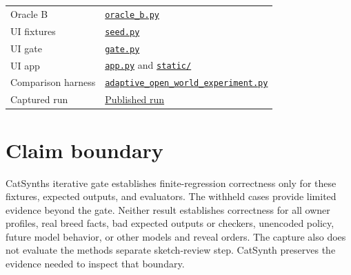 {\begin{longtable}[]{@{}
  >{\raggedright\arraybackslash}p{}
  >{\raggedright\arraybackslash}p{}@{}}
Oracle B & \href{https://github.com/open-horizon-labs/counterexample-supplemented-sketches/blob/main/examples/catsynth/catsynth/oracle_b.py}{\texttt{oracle\_b.py}} \\
UI fixtures & \href{https://github.com/open-horizon-labs/counterexample-supplemented-sketches/blob/main/examples/catsynth/catsynth/seed.py}{\texttt{seed.py}} \\
UI gate & \href{https://github.com/open-horizon-labs/counterexample-supplemented-sketches/blob/main/examples/catsynth/catsynth/gate.py}{\texttt{gate.py}} \\
UI app & \href{https://github.com/open-horizon-labs/counterexample-supplemented-sketches/blob/main/examples/catsynth/catsynth/app.py}{\texttt{app.py}} and \href{https://github.com/open-horizon-labs/counterexample-supplemented-sketches/tree/main/examples/catsynth/catsynth/static}{\texttt{static/}} \\
Comparison harness & \href{https://github.com/open-horizon-labs/counterexample-supplemented-sketches/blob/main/examples/catsynth/experiment/adaptive_open_world_experiment.py}{\texttt{adaptive\_open\_world\_experiment.py}} \\
Captured run & \href{https://github.com/open-horizon-labs/counterexample-supplemented-sketches/tree/main/examples/catsynth/experiment/results/gpt-5.4-mini-adaptive-open-world-v2-20260712}{Published run} \\
\end{longtable}
}

\section{Claim boundary}\label{claim-boundary}

CatSynth\textquotesingle s iterative gate establishes finite-regression correctness only for these fixtures,
expected outputs, and evaluators. The withheld cases provide limited evidence beyond the gate.
Neither result establishes correctness for all owner profiles, real breed facts, bad expected
outputs or checkers, unencoded policy, future model behavior, or other models and reveal orders.
The capture also does not evaluate the method\textquotesingle s separate sketch-review step. CatSynth preserves
the evidence needed to inspect that boundary.
